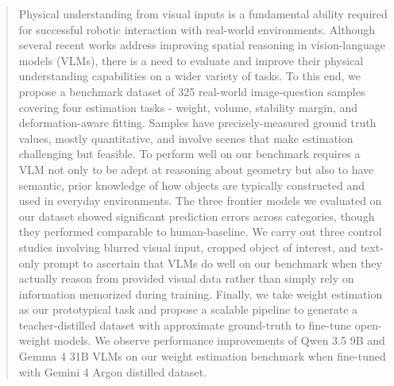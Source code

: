 \begin{abstract}
Physical understanding from visual inputs is a fundamental ability required for successful robotic interaction with real-world environments. Although several recent works address improving spatial reasoning in vision-language models (VLMs), there is a need to evaluate and improve their physical understanding capabilities on a wider variety of tasks. To this end, we propose a benchmark dataset of 325 real-world image-question samples covering four estimation tasks - weight, volume, stability margin, and deformation-aware fitting. Samples have precisely-measured ground truth values, mostly quantitative, and involve scenes that make estimation challenging but feasible. To perform well on our benchmark requires a VLM not only to be adept at reasoning about geometry but also to have semantic, prior knowledge of how objects are typically constructed and used in everyday environments. The three frontier models we evaluated on our dataset showed significant prediction errors across categories, though they performed comparable to human-baseline. We carry out three control studies involving blurred visual input, cropped object of interest, and text-only prompt to ascertain that VLMs do well on our benchmark when they actually reason from provided visual data rather than simply rely on information memorized during training. Finally, we take weight estimation as our prototypical task and propose a scalable pipeline to generate a teacher-distilled dataset with approximate ground-truth to fine-tune open-weight models. We observe performance improvements of Qwen 3.5 9B and Gemma 4 31B VLMs on our weight estimation benchmark when fine-tuned with Gemini 4 Argon distilled dataset.
\end{abstract}
